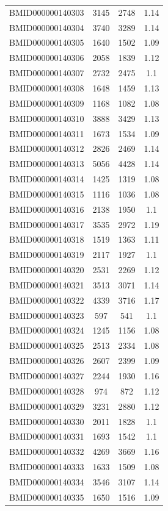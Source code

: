 \documentclass{bmcart}
\begin{document}
\begin{backmatter}
\begin{center}
\begin{longtable}{c|c|c|c}
BMID000000140303 & 3145 & 2748 & 1.14 \\
BMID000000140304 & 3740 & 3289 & 1.14 \\
BMID000000140305 & 1640 & 1502 & 1.09 \\
BMID000000140306 & 2058 & 1839 & 1.12 \\
BMID000000140307 & 2732 & 2475 & 1.1 \\
BMID000000140308 & 1648 & 1459 & 1.13 \\
BMID000000140309 & 1168 & 1082 & 1.08 \\
BMID000000140310 & 3888 & 3429 & 1.13 \\
BMID000000140311 & 1673 & 1534 & 1.09 \\
BMID000000140312 & 2826 & 2469 & 1.14 \\
BMID000000140313 & 5056 & 4428 & 1.14 \\
BMID000000140314 & 1425 & 1319 & 1.08 \\
BMID000000140315 & 1116 & 1036 & 1.08 \\
BMID000000140316 & 2138 & 1950 & 1.1 \\
BMID000000140317 & 3535 & 2972 & 1.19 \\
BMID000000140318 & 1519 & 1363 & 1.11 \\
BMID000000140319 & 2117 & 1927 & 1.1 \\
BMID000000140320 & 2531 & 2269 & 1.12 \\
BMID000000140321 & 3513 & 3071 & 1.14 \\
BMID000000140322 & 4339 & 3716 & 1.17 \\
BMID000000140323 & 597 & 541 & 1.1 \\
BMID000000140324 & 1245 & 1156 & 1.08 \\
BMID000000140325 & 2513 & 2334 & 1.08 \\
BMID000000140326 & 2607 & 2399 & 1.09 \\
BMID000000140327 & 2244 & 1930 & 1.16 \\
BMID000000140328 & 974 & 872 & 1.12 \\
BMID000000140329 & 3231 & 2880 & 1.12 \\
BMID000000140330 & 2011 & 1828 & 1.1 \\
BMID000000140331 & 1693 & 1542 & 1.1 \\
BMID000000140332 & 4269 & 3669 & 1.16 \\
BMID000000140333 & 1633 & 1509 & 1.08 \\
BMID000000140334 & 3546 & 3107 & 1.14 \\
BMID000000140335 & 1650 & 1516 & 1.09 \\

\end{longtable}
\end{center}
\end{backmatter}
\end{document}
